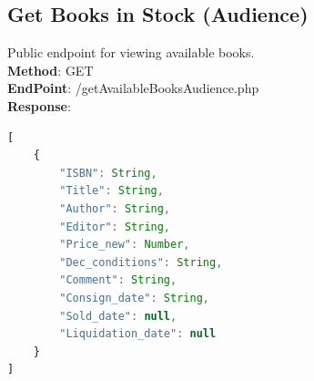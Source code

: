 \subsection{Get Books in Stock (Audience)}
Public endpoint for viewing available books.\\

\textbf{Method}: GET \\
\textbf{EndPoint}: /getAvailableBooksAudience.php \\

\textbf{Response}:
\begin{lstlisting}[language=JavaScript, basicstyle=\ttfamily]
[
    {
        "ISBN": String,
        "Title": String,
        "Author": String,
        "Editor": String,
        "Price_new": Number,
        "Dec_conditions": String,
        "Comment": String,
        "Consign_date": String,
        "Sold_date": null,
        "Liquidation_date": null
    }
]
\end{lstlisting}